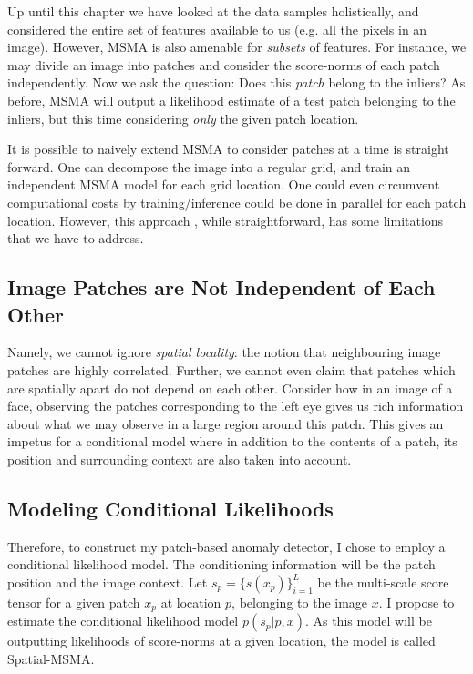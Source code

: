 Up until this chapter we have looked at the data samples holistically, and considered the entire set of features available to us (e.g. all the pixels in an image). However, MSMA is also amenable for \textit{subsets} of features. For instance, we may divide an image into patches and consider the score-norms of each patch independently. Now we ask the question: Does this \textit{patch} belong to the inliers? As before, MSMA will output a likelihood estimate of a test patch belonging to the inliers, but this time considering \textit{only} the given patch location.

It is possible to naively extend MSMA to consider patches at a time is straight forward. One can decompose the image into a regular grid, and train an independent MSMA model for each grid location. One could even circumvent computational costs by training/inference could be done in parallel for each patch location. However, this approach , while straightforward, has some limitations that we have to address.

\subsection*{Image Patches are Not Independent of Each Other}
Namely, we cannot ignore \textit{spatial locality}: the notion that neighbouring image patches are highly correlated. Further, we cannot even claim that patches which are spatially apart do not depend on each other. Consider how in an image of a face, observing the patches corresponding to the left eye gives us rich information about what we may observe in a large region around this patch. This gives an impetus for a conditional model where in addition to the contents of a patch,  its position and surrounding context are also taken into account.

\subsection*{Modeling Conditional Likelihoods}

Therefore, to construct my patch-based anomaly detector, I chose to employ a conditional likelihood model. The conditioning information will be the patch position and the image context. Let $ s_p = \{s(x_p)\}_{i=1}^{L}$ be the multi-scale score tensor for a given patch $x_p$ at location $p$, belonging to the image $x$. I propose to estimate the conditional likelihood model $p(s_p | p, x)$.  As this model will be outputting likelihoods of score-norms at a given location, the model is called Spatial-MSMA.

